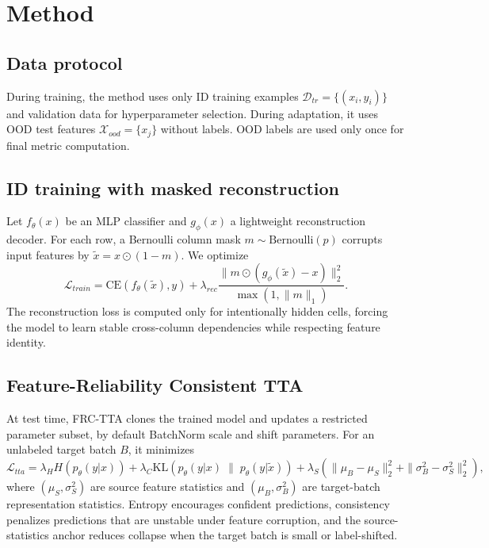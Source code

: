 \IfFileExists{neurips_2025.sty}{\documentclass{article}\usepackage[preprint]{neurips_2025}}{\documentclass[11pt]{article}\usepackage[margin=1in]{geometry}}
\begin{document}
\section{Method}
\subsection{Data protocol}
During training, the method uses only ID training examples $\mathcal{D}_{tr}=\{(x_i,y_i)\}$ and validation data for hyperparameter selection. During adaptation, it uses OOD test features $\mathcal{X}_{ood}=\{x_j\}$ without labels. OOD labels are used only once for final metric computation.

\subsection{ID training with masked reconstruction}
Let $f_\theta(x)$ be an MLP classifier and $g_\phi(x)$ a lightweight reconstruction decoder. For each row, a Bernoulli column mask $m\sim\mathrm{Bernoulli}(p)$ corrupts input features by $\tilde{x}=x\odot(1-m)$. We optimize
\begin{equation}
\mathcal{L}_{train}=\mathrm{CE}(f_\theta(\tilde{x}),y)+\lambda_{rec}\frac{\|m\odot(g_\phi(\tilde{x})-x)\|_2^2}{\max(1,\|m\|_1)}.
\end{equation}
The reconstruction loss is computed only for intentionally hidden cells, forcing the model to learn stable cross-column dependencies while respecting feature identity.

\subsection{Feature-Reliability Consistent TTA}
At test time, FRC-TTA clones the trained model and updates a restricted parameter subset, by default BatchNorm scale and shift parameters. For an unlabeled target batch $B$, it minimizes
\begin{equation}
\mathcal{L}_{tta}=\lambda_H H(p_\theta(y|x)) + \lambda_C \mathrm{KL}\left(p_\theta(y|x) \;\|\; p_\theta(y|\tilde{x})\right) + \lambda_S\left(\|\mu_B-\mu_S\|_2^2+\|\sigma_B^2-\sigma_S^2\|_2^2\right),
\end{equation}
where $(\mu_S,\sigma_S^2)$ are source feature statistics and $(\mu_B,\sigma_B^2)$ are target-batch representation statistics. Entropy encourages confident predictions, consistency penalizes predictions that are unstable under feature corruption, and the source-statistics anchor reduces collapse when the target batch is small or label-shifted.
\end{document}
